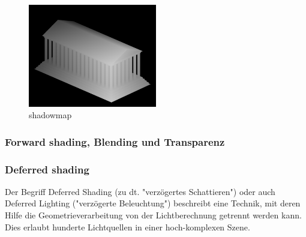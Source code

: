 \begin{figure}[H]
    \centering
    \includegraphics[width=0.5\textwidth]{images/sm_zb.png}
    \caption{shadowmap} %
    \label{fig:shadowmap3}
\end{figure}





\subsubsection{ Forward shading, Blending und Transparenz}

\subsubsection{Deferred shading}
Der Begriff Deferred Shading (zu dt. "verzögertes Schattieren") oder auch Deferred Lighting ("verzögerte Beleuchtung") beschreibt eine Technik, mit deren Hilfe die Geometrieverarbeitung von der Lichtberechnung getrennt werden kann. Dies erlaubt hunderte Lichtquellen in einer hoch-komplexen Szene.


